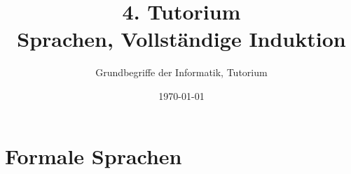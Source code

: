 




\title[Übersetzungen und Codierungen]{4. Tutorium\\ Sprachen, Vollständige Induktion}
\subtitle{Grundbegriffe der Informatik, Tutorium \hashtag\mytutnumber}
\date{\today}


\titleframe
\roadmap


\section{Formale Sprachen}




% 

% 

% 

